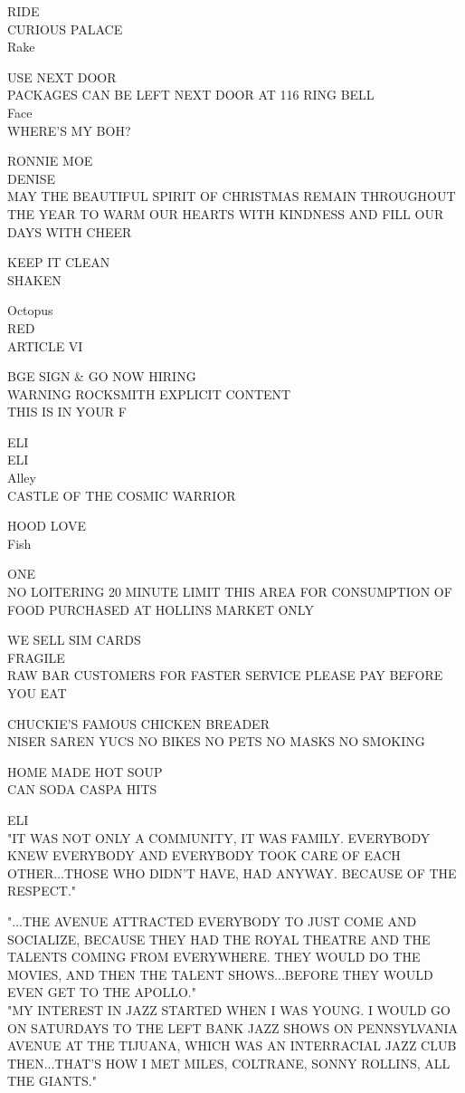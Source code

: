 \documentclass[10pt,letterpaper]{article}
\begin{document}
RIDE\\
CURIOUS PALACE\\
Rake

USE NEXT DOOR\\
PACKAGES CAN BE LEFT NEXT DOOR AT 116 RING BELL\\
Face\\
WHERE'S MY BOH?

RONNIE MOE\\
DENISE\\
MAY THE BEAUTIFUL SPIRIT OF CHRISTMAS REMAIN THROUGHOUT THE YEAR TO WARM OUR HEARTS WITH KINDNESS AND FILL OUR DAYS WITH CHEER

KEEP IT CLEAN\\
SHAKEN

Octopus\\
RED\\
ARTICLE VI

BGE SIGN \& GO NOW HIRING\\
WARNING ROCKSMITH EXPLICIT CONTENT\\
THIS IS IN YOUR F

ELI\\
ELI\\
Alley\\
CASTLE OF THE COSMIC WARRIOR

HOOD LOVE\\
Fish

ONE\\
NO LOITERING 20 MINUTE LIMIT THIS AREA FOR CONSUMPTION OF FOOD PURCHASED AT HOLLINS MARKET ONLY

WE SELL SIM CARDS\\
FRAGILE\\
RAW BAR CUSTOMERS FOR FASTER SERVICE PLEASE PAY BEFORE YOU EAT

CHUCKIE'S FAMOUS CHICKEN BREADER\\
NISER SAREN YUCS NO BIKES NO PETS NO MASKS NO SMOKING

HOME MADE HOT SOUP\\
CAN SODA CASPA HITS

ELI\\
"IT WAS NOT ONLY A COMMUNITY, IT WAS FAMILY.  EVERYBODY KNEW EVERYBODY AND EVERYBODY TOOK CARE OF EACH OTHER...THOSE WHO DIDN'T HAVE, HAD ANYWAY.  BECAUSE OF THE RESPECT."

"...THE AVENUE ATTRACTED EVERYBODY TO JUST COME AND SOCIALIZE, BECAUSE THEY HAD THE ROYAL THEATRE AND THE TALENTS COMING FROM EVERYWHERE.  THEY WOULD DO THE MOVIES, AND THEN THE TALENT SHOWS...BEFORE THEY WOULD EVEN GET TO THE APOLLO."\\
"MY INTEREST IN JAZZ STARTED WHEN I WAS YOUNG.  I WOULD GO ON SATURDAYS TO THE LEFT BANK JAZZ SHOWS ON PENNSYLVANIA AVENUE AT THE TIJUANA, WHICH WAS AN INTERRACIAL JAZZ CLUB THEN...THAT'S HOW I MET MILES, COLTRANE, SONNY ROLLINS, ALL THE GIANTS."
\end{document}
